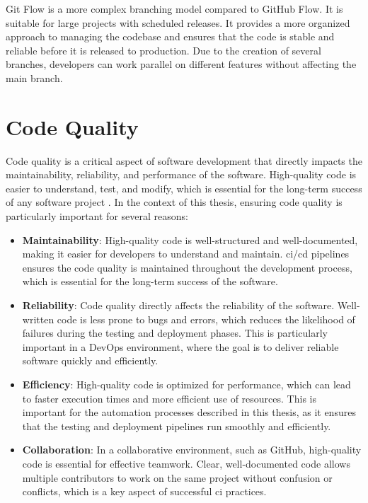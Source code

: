 Git Flow is a more complex branching model compared to GitHub Flow. It is suitable for large projects with scheduled releases. It provides a more organized 
approach to managing the codebase and ensures that the code is stable and reliable before it is released to production. Due to the creation of several branches, 
developers can work parallel on different features without affecting the main branch.

\section{Code Quality}
Code quality is a critical aspect of software development that directly impacts the maintainability, reliability, and performance of the software. High-quality 
code is easier to understand, test, and modify, which is essential for the long-term success of any software project \cite{6862882}. In the context of this thesis, ensuring 
code quality is particularly important for several reasons:

\begin{itemize}
    \item \textbf{Maintainability}:\newline 
    High-quality code is well-structured and well-documented, making it easier for developers to understand and maintain. \acrshort{ci}/\acrshort{cd} pipelines 
    ensures the code quality is maintained throughout the development process, which is essential for the long-term success of the software. 
    \item \textbf{Reliability}:\newline 
    Code quality directly affects the reliability of the software. Well-written code is less prone to bugs and errors, which reduces the likelihood of failures 
    during the testing and deployment phases. This is particularly important in a DevOps environment, where the goal is to deliver reliable software quickly 
    and efficiently.
    \item \textbf{Efficiency}:\newline 
    High-quality code is optimized for performance, which can lead to faster execution times and more efficient use of resources. This is important for the 
    automation processes described in this thesis, as it ensures that the testing and deployment pipelines run smoothly and efficiently.
    \item \textbf{Collaboration}:\newline 
    In a collaborative environment, such as GitHub, high-quality code is essential for effective teamwork. Clear, well-documented code allows multiple contributors 
    to work on the same project without confusion or conflicts, which is a key aspect of successful \acrshort{ci} practices.
\end{itemize}

